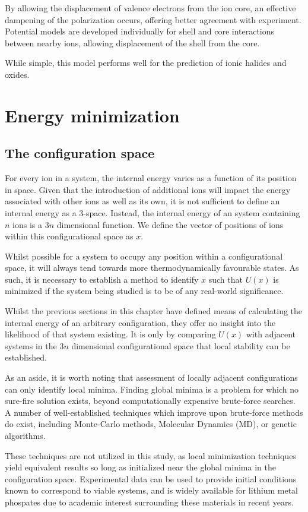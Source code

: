 By allowing the displacement of valence electrons from the ion core, an effective dampening of the polarization occurs, offering better agreement with experiment.
Potential models are developed individually for shell and core interactions between nearby ions, allowing displacement of the shell from the core.


While simple, this model performs well for the prediction of ionic halides and oxides.
\section{Energy minimization}
\subsection{The configuration space}
For every ion in a system, the internal energy varies as a function of its position in space.
Given that the introduction of additional ions will impact the energy associated with other ions as well as its own, it is not sufficient to define an internal energy as a 3-space.
Instead, the internal energy of an system containing $n$ ions is a $3n$ dimensional function.
We define the vector of positions of ions within this configurational space as $x$.

Whilst possible for a system to occupy any position within a configurational space, it will always tend towards more thermodynamically favourable states.
As such, it is necessary to establish a method to identify $x$ such that $U(x)$ is minimized if the system being studied is to be of any real-world significance.

Whilst the previous sections in this chapter have defined means of calculating the internal energy of an arbitrary configuration, they offer no insight into the likelihood of that system existing.
It is only by comparing $U(x)$ with adjacent systems in the $3n$ dimensional configurational space that local stability can be established.


As an aside, it is worth noting that assessment of locally adjacent configurations can only identify local minima.
Finding global minima is a problem for which no sure-fire solution exists, beyond computationally expensive brute-force searches.
A number of well-established techniques which improve upon brute-force methods do exist, including Monte-Carlo methods,\cite{Allan2001} Molecular Dynamics (MD), or genetic algorithms. \cite{Barnes1992}

These techniques are not utilized in this study, as local minimization techniques yield equivalent results so long as initialized near the global minima in the configuration space.
Experimental data can be used to provide initial conditions known to correspond to viable systems, and is widely available for lithium metal phospates due to academic interest surrounding these materials in recent years.

